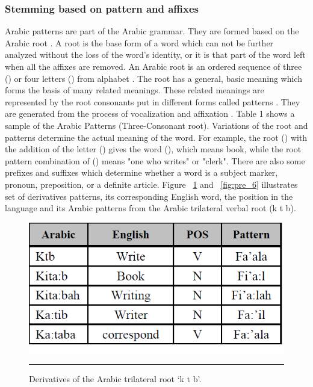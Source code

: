 \subsubsection{Stemming based on pattern and affixes}
Arabic patterns are part of the Arabic grammar. They are formed based on the Arabic root \citep{pre_4}. A
root is the base form of a word which can not be further analyzed without the loss of the word's
identity, or it is that part of the word left when all the affixes are removed.
An Arabic root is an ordered sequence of three () or four letters () from alphabet \citep{pre_5}. The
root has a general, basic meaning which forms the basis of many related meanings. These related
meanings are represented by the root consonants put in different forms called patterns \citep{pre_6}. They
are generated from the process of vocalization and affixation \citep{pre_20}. Table 1 shows a sample of the
Arabic Patterns (Three-Consonant root).
Variations of the root and patterns determine the actual meaning of the word. For example, the
root () with the addition of the letter () gives the word (), which means book, while the root pattern combination of 
() means "one who writes" or "clerk". There are
also some prefixes and suffixes which determine whether a word is a subject marker, pronoun,
preposition, or a definite article. Figure ~\ref{fig:pre_5} and ~\ref{fig:pre_6} illustrates set of derivatives patterns, its corresponding
English word, the position in the language and its Arabic patterns from the Arabic trilateral verbal
root  (k t b).


\begin{figure}[htbp]
	\begin{center}
		\includegraphics{./Figures/pre_5.png}
		\rule{20em}{0.001pt}
	\end{center}
	\caption[Derivatives of the Arabic trilateral root ‘k t b’.]{Derivatives of the Arabic trilateral root ‘k t b’.}
	\label{fig:pre_5}
\end{figure}

